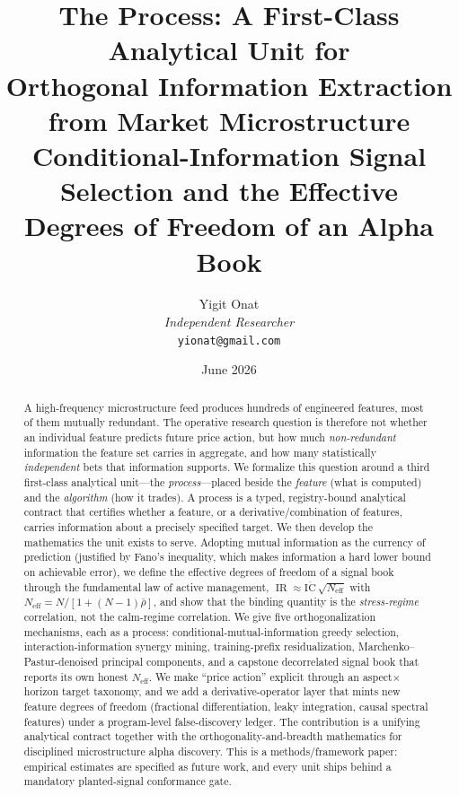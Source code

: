 \documentclass[11pt,a4paper]{article}
\theoremstyle{definition}
\theoremstyle{plain}
\newcommand{\Neff}{N_{\mathrm{eff}}}
\newcommand{\ICbar}{\overline{\mathrm{IC}}}
\newcommand{\rhobar}{\bar{\rho}}
\DeclareMathOperator{\IR}{IR}
\begin{document}
\title{\textbf{The Process: A First-Class Analytical Unit for\\[3pt]
Orthogonal Information Extraction from Market Microstructure}\\[6pt]
\large Conditional-Information Signal Selection and the Effective\\
Degrees of Freedom of an Alpha Book}

\author{Yigit Onat\\
\textit{Independent Researcher}\\
\texttt{yionat@gmail.com}}
\date{June 2026}
\maketitle

\begin{abstract}
A high-frequency microstructure feed produces hundreds of engineered features, most of them
mutually redundant. The operative research question is therefore not whether an individual feature
predicts future price action, but how much \emph{non-redundant} information the feature set carries
in aggregate, and how many statistically \emph{independent} bets that information supports. We
formalize this question around a third first-class analytical unit---the \emph{process}---placed
beside the \emph{feature} (what is computed) and the \emph{algorithm} (how it trades). A process is
a typed, registry-bound analytical contract that certifies whether a feature, or a
derivative/combination of features, carries information about a precisely specified target. We then
develop the mathematics the unit exists to serve. Adopting mutual information as the currency of
prediction (justified by Fano's inequality, which makes information a hard lower bound on
achievable error), we define the effective degrees of freedom of a signal book through the
fundamental law of active management, $\IR \approx \ICbar\,\sqrt{\Neff}$ with
$\Neff = N/[1+(N-1)\rhobar]$, and show that the binding quantity is the \emph{stress-regime}
correlation, not the calm-regime correlation. We give five orthogonalization mechanisms, each as a
process: conditional-mutual-information greedy selection, interaction-information synergy mining,
training-prefix residualization, Marchenko--Pastur-denoised principal components, and a capstone
decorrelated signal book that reports its own honest $\Neff$. We make ``price action'' explicit
through an aspect$\times$horizon target taxonomy, and we add a derivative-operator layer that mints
new feature degrees of freedom (fractional differentiation, leaky integration, causal spectral
features) under a program-level false-discovery ledger. The contribution is a unifying analytical
contract together with the orthogonality-and-breadth mathematics for disciplined microstructure
alpha discovery. This is a methods/framework paper: empirical estimates are specified as future
work, and every unit ships behind a mandatory planted-signal conformance gate.
\end{abstract}
\end{document}
